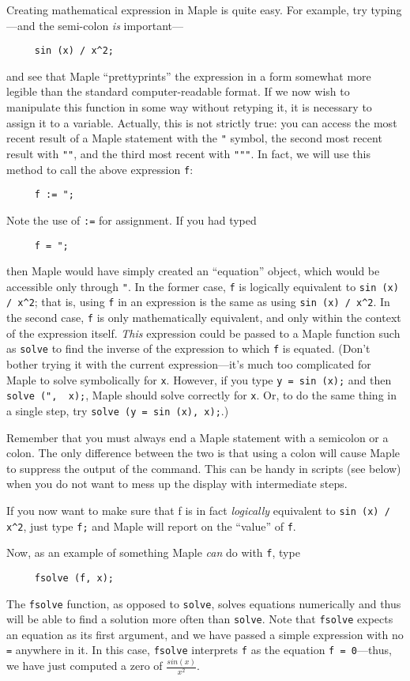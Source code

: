 \documentclass[11pt]{article}
\def\code#1{{\tt #1}}
\begin{document}
Creating mathematical expression in Maple is quite easy.  For example,
try typing---and the semi-colon {\em is} important---
\begin{verbatim}
     sin (x) / x^2;
\end{verbatim}
and see that Maple ``prettyprints'' the expression in a form somewhat
more legible than the standard computer-readable format.  If we now wish
to manipulate this function in some way without retyping it, it is
necessary to assign it to a variable.  Actually, this is not strictly
true: you can access the most recent result of a Maple statement with
the \code{"} symbol, the second most recent result with \code{""}, and
the third most recent with \code{"""}.  In fact, we will use this
method to call the above expression \code{f}:
\begin{verbatim}
     f := ";
\end{verbatim}
%
Note the use of \code{:=} for assignment.  If you had typed
\begin{verbatim}
     f = ";
\end{verbatim}
then Maple would have simply created an ``equation'' object, which
would be accessible only through \code{"}.  In the former case,
\code{f} is logically equivalent to \verb|sin (x) / x^2|; that is,
using \code{f} in an expression is the same as using \verb|sin (x) / x^2|.  
In the second case, \code{f} is only mathematically equivalent,
and only within the context of the expression itself. {\em This}
expression could be passed to a Maple function such as \code{solve} to
find the inverse of the expression to which \code{f} is equated.
(Don't bother trying it with the current expression---it's much too
complicated for Maple to solve symbolically for
\code{x}.  However, if you type \code{y~=~sin (x);} and then \code{solve (",~
x);}, Maple should solve correctly for \code{x}.  Or, to do the same thing in a
single step, try \code{solve (y = sin (x), x);}.)

Remember that you must always end a Maple statement with a semicolon
or a colon.  The only difference between the two is that using a colon
will cause Maple to suppress the output of the command.  This can be
handy in scripts (see below) when you do not want to mess up the
display with intermediate steps.

If you now want to make sure that f is in fact {\em logically} equivalent
to \verb|sin (x) / x^2|, just type \code{f;} and Maple will report on
the ``value'' of \code{f}.

Now, as an example of something Maple {\em can} do with \code{f}, type
\begin{verbatim}
     fsolve (f, x);
\end{verbatim}
The \verb|fsolve| function, as opposed to \verb|solve|, solves
equations numerically and thus will be able to find a solution more
often than \verb|solve|.  Note that \verb|fsolve| expects an equation
as its first argument, and we have passed a simple expression with no
\verb|=| anywhere in it.  In this case, \verb|fsolve| interprets
\verb|f| as the equation \verb|f = 0|---thus, we have just computed a
zero of $\frac{sin(x)}{x^{2}}$.
\end{document}
